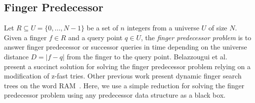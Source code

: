 \subsection{Finger Predecessor}
Let $R \subseteq U = \{ 0, \ldots, N-1 \}$ be a set of $n$ integers from a universe $U$ of size $N$. Given a finger $f \in R$ and a query point $q \in U$, the \emph{finger predecessor problem} is to answer finger predecessor or successor queries in time depending on the universe distance $D = |f-q|$ from the finger to the query point. %
Belazzougui et al.~\cite{fingerpred} present a succinct solution for solving the finger predecessor problem relying on a modification of z-fast tries. Other previous work present dynamic finger search trees on the word RAM~\cite{kaporis2013improved, andersson2007dynamic}. Here, we use a simple reduction for solving the finger predecessor problem using any predecessor data structure as a black box. 

